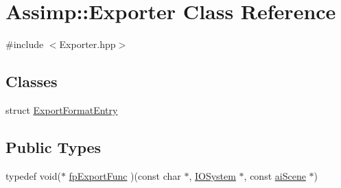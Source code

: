 \hypertarget{classAssimp_1_1Exporter}{\section{\-Assimp\-:\-:\-Exporter \-Class \-Reference}
\label{classAssimp_1_1Exporter}
}


{\ttfamily \#include $<$\-Exporter.\-hpp$>$}

\subsection*{\-Classes}
\begin{DoxyCompactItemize}
\item 
struct \hyperlink{structAssimp_1_1Exporter_1_1ExportFormatEntry}{\-Export\-Format\-Entry}
\end{DoxyCompactItemize}
\subsection*{\-Public \-Types}
\begin{DoxyCompactItemize}
\item 
typedef void($\ast$ \hyperlink{classAssimp_1_1Exporter_aa67334a75cb24e030af984d01e622f3b}{fp\-Export\-Func} )(const char $\ast$, \hyperlink{classAssimp_1_1IOSystem}{\-I\-O\-System} $\ast$, const \hyperlink{structaiScene}{ai\-Scene} $\ast$)
\end{DoxyCompactItemize}
